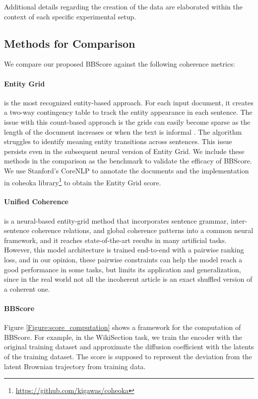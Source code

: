 \documentclass[letterpaper]{article} %
\begin{document}
Additional details regarding the creation of the data are elaborated within the context of each specific experimental setup.


\subsection{Methods for Comparison}
We compare our proposed BBScore against the following coherence metrics:

\paragraph{Entity Grid} \citet{barzilay-lapata-2005-modeling} is the most recognized entity-based approach. For each input document, it creates a two-way contingency table to track the entity appearance in each sentence. The issue with this count-based approach is the grids can easily become sparse as the length of the document increases or when the text is informal \citep{lai-tetreault-2018-discourse}. The algorithm struggles to identify meaning entity transitions across sentences. This issue persists even in the subsequent neural version of Entity Grid. We include these methods in the comparison as the benchmark to validate the efficacy of BBScore. We use Stanford's CoreNLP to annotate the documents and the implementation in coheoka library\footnote[1]{\url{https://github.com/kigawas/coheoka}} to obtain the Entity Grid score.
\paragraph{Unified Coherence} \citet{moon-etal-2019-unified} is a neural-based entity-grid method that incorporates sentence grammar, inter-sentence coherence relations, and global coherence patterns into a common neural framework, and it reaches state-of-the-art results in many artificial tasks. However, this model architecture is trained end-to-end with a pairwise ranking loss, and in our opinion, these pairwise constraints can help the model reach a good performance in some tasks, but limits its application and generalization, since in the real world not all the incoherent article is an exact shuffled version of a coherent one. 
\paragraph{BBScore} Figure \ref{Figure:score_computation} shows a framework for the computation of BBScore. For example, in the WikiSection task, we train the encoder with the original training dataset and approximate the diffusion coefficient with the latents of the training dataset. The score is supposed to represent the deviation from the latent Brownian trajectory from training data.
\end{document}
